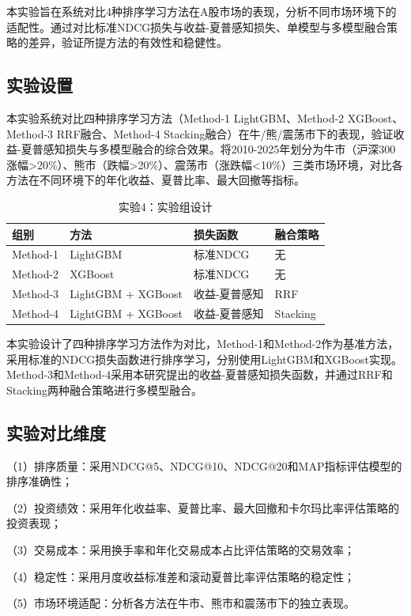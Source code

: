 \documentclass[11pt,a4paper]{ctexart}
\begin{document}
本实验旨在系统对比4种排序学习方法在A股市场的表现，分析不同市场环境下的适配性。通过对比标准NDCG损失与收益-夏普感知损失、单模型与多模型融合策略的差异，验证所提方法的有效性和稳健性。

\subsection{实验设置}
本实验系统对比四种排序学习方法（Method-1 LightGBM、Method-2 XGBoost、Method-3 RRF融合、Method-4 Stacking融合）在牛/熊/震荡市下的表现，验证收益-夏普感知损失与多模型融合的综合效果。将2010-2025年划分为牛市（沪深300涨幅>20\%）、熊市（跌幅>20\%）、震荡市（涨跌幅<10\%）三类市场环境，对比各方法在不同环境下的年化收益、夏普比率、最大回撤等指标。

\begin{table}[htbp]
\centering
\caption{实验4：实验组设计}
\label{tab:exp4-groups}
\begin{tabular}{llll}
\toprule
\textbf{组别} & \textbf{方法} & \textbf{损失函数} & \textbf{融合策略} \\
\midrule
Method-1 & LightGBM & 标准NDCG & 无 \\
Method-2 & XGBoost & 标准NDCG & 无 \\
Method-3 & LightGBM + XGBoost & 收益-夏普感知 & RRF \\
Method-4 & LightGBM + XGBoost & 收益-夏普感知 & Stacking \\
\bottomrule
\end{tabular}
\end{table}

本实验设计了四种排序学习方法作为对比，Method-1和Method-2作为基准方法，采用标准的NDCG损失函数进行排序学习，分别使用LightGBM和XGBoost实现。Method-3和Method-4采用本研究提出的收益-夏普感知损失函数，并通过RRF和Stacking两种融合策略进行多模型融合。

\subsection{实验对比维度}

（1）排序质量：采用NDCG@5、NDCG@10、NDCG@20和MAP指标评估模型的排序准确性；

（2）投资绩效：采用年化收益率、夏普比率、最大回撤和卡尔玛比率评估策略的投资表现；

（3）交易成本：采用换手率和年化交易成本占比评估策略的交易效率；

（4）稳定性：采用月度收益标准差和滚动夏普比率评估策略的稳定性；

（5）市场环境适配：分析各方法在牛市、熊市和震荡市下的独立表现。
\end{document}
